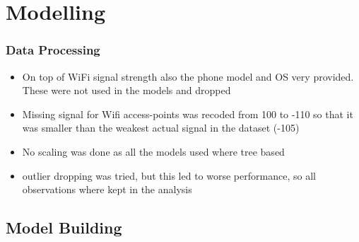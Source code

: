 \documentclass[10pt]{beamer}
\begin{document}
\section{Modelling}

\begin{frame}
\frametitle{Data Processing}

\begin{itemize}
    \item On top of WiFi signal strength also the phone model and OS very provided.
    These were not used in the models and dropped
    \item Missing signal for Wifi access-points was recoded from 100 to -110 so that
    it was smaller than the weakest actual signal in the dataset (-105)
    \item No scaling was done as all the models used where tree based
    \item outlier dropping was tried, but this led to worse performance, so all
    observations where kept in the analysis
\end{itemize}

\end{frame}

\subsection{Model Building}
\end{document}
